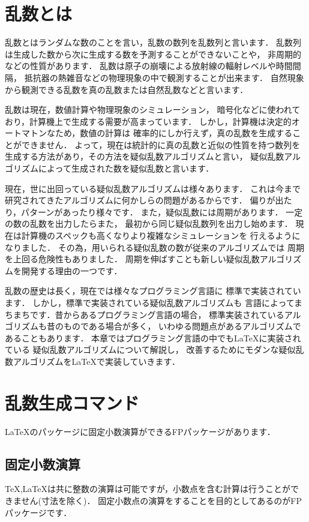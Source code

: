 \section{乱数とは}
乱数とはランダムな数のことを言い，乱数の数列を乱数列と言います．
乱数列は生成した数から次に生成する数を予測することができないことや，
非周期的などの性質があります．
乱数は原子の崩壊による放射線の輻射レベルや時間間隔，
抵抗器の熱雑音などの物理現象の中で観測することが出来ます．
自然現象から観測できる乱数を真の乱数または自然乱数などと言います．

乱数は現在，数値計算や物理現象のシミュレーション，
暗号化などに使われており，計算機上で生成する需要が高まっています．
しかし，計算機は決定的オートマトンなため，数値の計算は
確率的にしか行えず，真の乱数を生成することができません．
よって，現在は統計的に真の乱数と近似の性質を持つ数列を
生成する方法があり，その方法を疑似乱数アルゴリズムと言い，
疑似乱数アルゴリズムによって生成された数を疑似乱数と言います．

現在，世に出回っている疑似乱数アルゴリズムは様々あります．
これは今まで研究されてきたアルゴリズムに何かしらの問題があるからです．
偏りが出たり，パターンがあったり様々です．
また，疑似乱数には周期があります．
一定の数の乱数を出力したらまた，
最初から同じ疑似乱数列を出力し始めます．
現在は計算機のスペックも高くなりより複雑なシミュレーションを
行えるようになりました．
その為，用いられる疑似乱数の数が従来のアルゴリズムでは
周期を上回る危険性もありました．
周期を伸ばすことも新しい疑似乱数アルゴリズムを開発する理由の一つです．

乱数の歴史は長く，現在では様々なプログラミング言語に
標準で実装されています．
しかし，標準で実装されている疑似乱数アルゴリズムも
言語によってまちまちです．昔からあるプログラミング言語の場合，
標準実装されているアルゴリズムも昔のものである場合が多く，
いわゆる問題点があるアルゴリズムであることもあります．
本章ではプログラミング言語の中でも\LaTeX に実装されている
疑似乱数アルゴリズムについて解説し，
改善するためにモダンな疑似乱数アルゴリズムを\LaTeX で実装していきます．
\section{乱数生成コマンド}
\LaTeX のパッケージに固定小数演算ができるFPパッケージがあります．
\subsection{固定小数演算}
\TeX ,\LaTeX は共に整数の演算は可能ですが，小数点を含む計算は行うことができません(寸法を除く)．
固定小数点の演算をすることを目的としてあるのがFPパッケージです．
